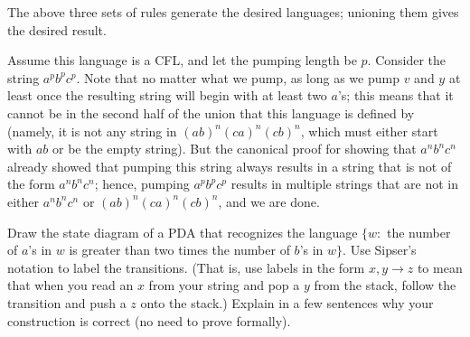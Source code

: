 \documentclass[solution, letterpaper]{cs121}
\begin{document}
\begin{solution}
The above three sets of rules generate the desired languages; unioning them gives the desired result.

\subsolution Assume this language is a CFL, and let the pumping length be $p$.  Consider the string $a^pb^pc^p$.  Note that no matter what we pump, as long as we pump $v$ and $y$ at least once the resulting string will begin with at least two $a$'s; this means that it cannot be in the second half of the union that this language is defined by (namely, it is not any string in $(ab)^n(ca)^n(cb)^n$, which must either start with $ab$ or be the empty string).  But the canonical proof for showing that $a^nb^nc^n$ already showed that pumping this string always results in a string that is not of the form $a^nb^nc^n$; hence, pumping $a^pb^pc^p$ results in multiple strings that are not in either $a^nb^nc^n$ or $(ab)^n(ca)^n(cb)^n$, and we are done.
\end{solution}


Draw the state diagram of a PDA that recognizes the language $\{w :$ the number
of $a$'s in $w$ is greater than two times the number of $b$'s in $w\}$. Use
Sipser's notation to label the transitions. (That is, use labels in the form
$x,y\to z$ to mean that when you read an $x$ from your string and pop a $y$
from the stack, follow the transition and push a $z$ onto the stack.) Explain
in a few sentences why your construction is correct (no need to prove
formally).
\end{document}
